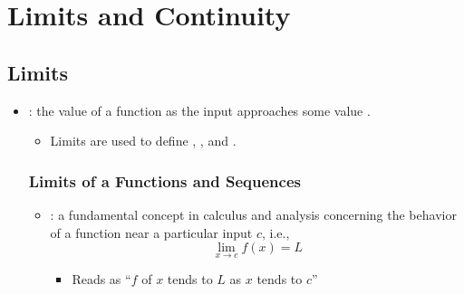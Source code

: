 \chapter{Limits and Continuity}


\section{Limits}

\begin{itemize}
  \item {}: the value of a function  as the input  approaches some value
    .
    \begin{itemize}
      \item Limits are used to define ,
        , and .
    \end{itemize}

  \subsection{Limits of a Functions and Sequences}
  \begin{itemize}
    \item {}: a fundamental concept in calculus and
      analysis concerning the behavior of a function near a particular input
      \(c\), i.e.,
      \[
      \lim_{x \to c}f(x)=L
      \]
   \begin{itemize}
     \item Reads as ``\(f\) of \(x\) tends to \(L\) as \(x\) tends to \(c\)''
   \end{itemize}


\end{itemize}
\end{itemize}
